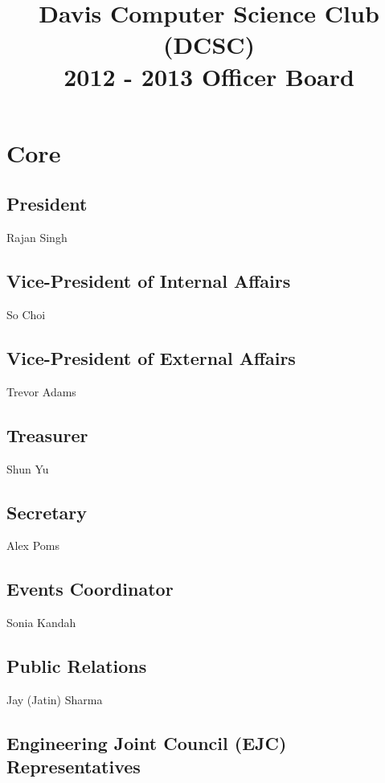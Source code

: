 \documentclass[10pt]{article}
\title{Davis Computer Science Club (DCSC)\\2012 - 2013 Officer Board}
\date{}
\author{}
\begin{document}
\maketitle

\section{Core}

\subsection{President}

Rajan Singh

\subsection{Vice-President of Internal Affairs}

So Choi

\subsection{Vice-President of External Affairs}

Trevor Adams

\subsection{Treasurer}

Shun Yu

\subsection{Secretary}

Alex Poms

\subsection{Events Coordinator}

Sonia Kandah

\subsection{Public Relations}

Jay (Jatin) Sharma

\subsection{Engineering Joint Council (EJC) Representatives}
\end{document}
